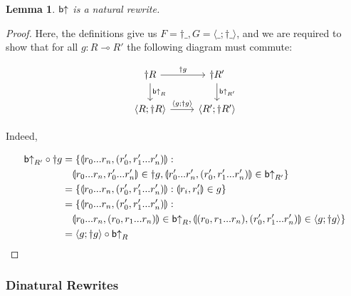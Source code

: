 \documentclass[11pt, oneside]{article}
\theoremstyle{plain}
\newtheorem{lemma}[theorem]{Lemma}
\theoremstyle{definition}
\let\originaldagger\dagger
\renewcommand{\dag}{\mathord{\originaldagger}}
\newcommand{\la}{\langle}
\newcommand{\ra}{\rangle}
\newcommand{\lp}{\llparenthesis}
\newcommand{\rp}{\rrparenthesis}
\newcommand{\comp}{\mathbin{\circ}}
\begin{document}
\begin{lemma}
${\mathsf b}{ \uparrow}$ is a natural rewrite.
\end{lemma}

\begin{proof}
Here, the definitions give us $F = \dag\_, G = \la\_;\dag\_\ra$, and we are required to show that for all $g:R\multimap R'$ the following diagram must commute:

\[
\begin{tikzcd}
    \dag R \arrow[r,"\dag g"]\arrow[d,"\bU_{R}"]& \dag R' \arrow[d,"\bU_{R'}"] \\
    \la R; \dag R\ra \arrow[r,"\la g;\dag g\ra"] & \la R';\dag R'\ra
\end{tikzcd}
\]

Indeed,

\begin{align*}
\bU_{R'}\comp\dag g &= \{\lp r_0...r_n,(r'_0,r'_1...r'_n)\rp: \\
&\quad\lp r_0...r_n,r'_0...r'_n\rp\in\dag g,\lp r'_0...r'_n,(r'_0,r'_1...r'_n)\rp\in\bU_{R'}\} \\
&= \{\lp r_0...r_n,(r'_0,r'_1...r'_n)\rp:\lp r_i,r'_i\rp\in g\} \\
&= \{\lp r_0...r_n,(r'_0,r'_1...r'_n)\rp: \\
&\quad\lp r_0...r_n,(r_0,r_1...r_n)\rp\in\bU_{R},\lp(r_0,r_1...r_n),(r'_0,r'_1...r'_n)\rp\in\la g;\dag g\ra\} \\
&= \la g;\dag g\ra\comp\bU_{R}
\end{align*}
\end{proof}

\subsubsection{Dinatural Rewrites}
\end{document}
